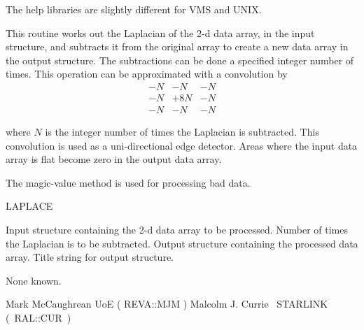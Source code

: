 {{{{         \sstitem
         The help libraries are slightly different for VMS and UNIX.
      }
   }
}

\begin{manroutinedescription}
  This routine works out the Laplacian of the 2-d data array, in the
  input {} structure, and subtracts it from the original array
  to create a new data array in the output {} structure. The
  subtractions can be done a specified integer number of times.
  This operation can be approximated with a convolution by
\[
\begin{array}{ccc}
  -N & -N & -N \\
  -N & +8N & -N \\
  -N & -N & -N
\end{array}
\]

  where {$N$} is the integer number of times the Laplacian is
  subtracted.  This convolution is used as a uni-directional edge
  detector.  Areas where the input data array is flat become zero
  in the output data array.

  The magic-value method is used for processing bad data.

  LAPLACE

\begin{manparametertable}
  Input {} structure containing the 2-d data array to be
  processed.
  Number of times the Laplacian is to be subtracted. \mbox{\mantt [1]}
  Output {} structure containing the processed data array.
  Title string for output {} structure. \mbox{}
\end{manparametertable}
  None known.

  Mark McCaughrean UoE ( {\mantt REVA}::{\mantt MJM} )
  Malcolm J. Currie ~STARLINK \mbox{( {\mantt RAL}::{\mantt CUR} )}
\end{manroutinedescription}

 
}
